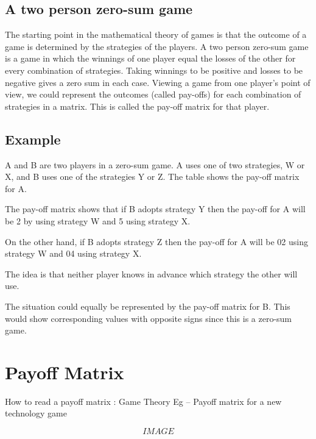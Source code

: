 \documentclass[]{report}
\begin{document}
\subsection{A two person zero-sum game}
The starting point in the mathematical theory of games is that the outcome of a game is determined by the strategies of the players.
A  two person zero-sum game is a game in which the winnings of one player equal the losses of the other for every combination of strategies. Taking winnings to be positive and losses to be negative gives a zero sum in each case. Viewing a game from one player’s point of view, we could represent the outcomes (called pay-offs) for each combination of strategies in a matrix. This is called the pay-off matrix for that player.

\subsection{Example}
A and B are two players in a zero-sum game. A uses one of two strategies, W or X, and B uses one of the strategies Y or Z. The table shows the pay-off matrix for A.

The pay-off matrix shows that if B adopts strategy Y then the pay-off for A will be 2 by using strategy W and 5 using strategy X.

On the other hand, if B adopts strategy Z then the pay-off for A will be 02 using strategy W and 04 using strategy X.

The idea is that neither player knows in advance which strategy the other will use.

The situation could equally be represented by the pay-off matrix for B. This would show corresponding values with opposite signs since this is a zero-sum game.


\section{Payoff Matrix}

How to read a payoff matrix : Game Theory
Eg – Payoff matrix for a new technology game 

\[IMAGE\]
\end{document}
